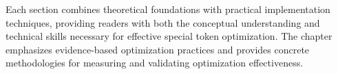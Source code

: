 Each section combines theoretical foundations with practical implementation techniques, providing readers with both the conceptual understanding and technical skills necessary for effective special token optimization. The chapter emphasizes evidence-based optimization practices and provides concrete methodologies for measuring and validating optimization effectiveness.